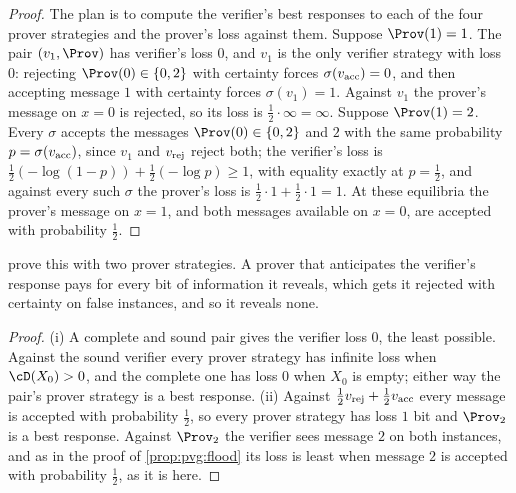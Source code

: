 \begin{refsection}
\begin{proof}
The plan is to compute the verifier's best responses to each of the four prover strategies and the prover's loss against them. Suppose $\Prov(1)=1$. The pair $(v_1,\Prov)$ has verifier's loss $0$, and $v_1$ is the only verifier strategy with loss $0$: rejecting $\Prov(0)\in\{0,2\}$ with certainty forces $\sigma(v_{\mathrm{acc}})=0$, and then accepting message $1$ with certainty forces $\sigma(v_1)=1$. Against $v_1$ the prover's message on $x=0$ is rejected, so its loss is $\frac12\cdot\infty=\infty$. Suppose $\Prov(1)=2$. Every $\sigma$ accepts the messages $\Prov(0)\in\{0,2\}$ and $2$ with the same probability $p=\sigma(v_{\mathrm{acc}})$, since $v_1$ and $v_{\mathrm{rej}}$ reject both; the verifier's loss is $\frac12(-\log(1-p))+\frac12(-\log p)\ge1$, with equality exactly at $p=\frac12$, and against every such $\sigma$ the prover's loss is $\frac12\cdot1+\frac12\cdot1=1$. At these equilibria the prover's message on $x=1$, and both messages available on $x=0$, are accepted with probability $\frac12$.
\end{proof}

\Textcite[Theorem~1]{AnilEtAl2021} prove this with two prover strategies. A prover that anticipates the verifier's response pays for every bit of information it reveals, which gets it rejected with certainty on false instances, and so it reveals none.


\begin{proof}
(i) A complete and sound pair gives the verifier loss $0$, the least possible. Against the sound verifier every prover strategy has infinite loss when $\cD(X_0)>0$, and the complete one has loss $0$ when $X_0$ is empty; either way the pair's prover strategy is a best response. (ii) Against $\frac12v_{\mathrm{rej}}+\frac12v_{\mathrm{acc}}$ every message is accepted with probability $\frac12$, so every prover strategy has loss $1$ bit and $\Prov_2$ is a best response. Against $\Prov_2$ the verifier sees message $2$ on both instances, and as in the proof of \cref{prop:pvg:flood} its loss is least when message $2$ is accepted with probability $\frac12$, as it is here.
\end{proof}


\end{refsection}

